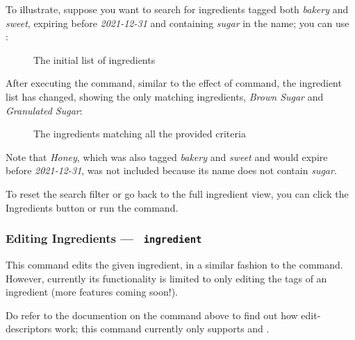 	To illustrate, suppose you want to search for ingredients tagged both \emph{bakery} and \emph{sweet}, expiring before
	\emph{2021-12-31} and containing \emph{sugar} in the name; you can use
	\\
	:

	\begin{figure}[!htbp]\centering\ContinuedFloat*
		\caption{The initial list of ingredients}
	\end{figure}

	After executing the command, similar to the effect of  command, the ingredient list has changed, showing the only matching ingredients, \emph{Brown Sugar} and \emph{Granulated Sugar}:

	\begin{figure}[!htbp]\centering\ContinuedFloat
		\caption{The ingredients matching all the provided criteria}
	\end{figure}

	Note that \emph{Honey}, which was also tagged \emph{bakery} and \emph{sweet} and would expire before \emph{2021-12-31}, was not included because its name does not contain \emph{sugar}.

	To reset the search filter or go back to the full ingredient view, you can click the Ingredients button or run the
	 command.







\pagebreak
\hypertarget{EditIngredientCommand}{}
\subsubsection{Editing Ingredients — \texttt{ ingredient}}

	This command edits the given ingredient, in a similar fashion to the \hyperlink{EditRecipeCommand}{} command.
	However, currently its functionality is limited to only editing the tags of an ingredient (more features coming soon!).

	Do refer to the documention on the \hyperlink{EditRecipeCommand}{} command above to find out how edit-descriptors
	work; this command currently only supports  and .

